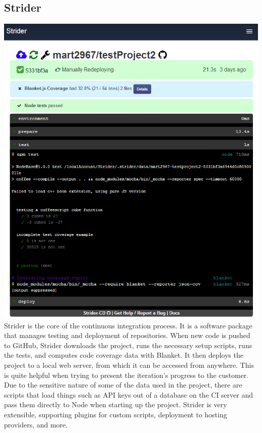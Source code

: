 \documentclass[12pt]{article}
\begin{document}
\subsection{Strider}\label{sec:strider}
\includegraphics[width=\linewidth]{img/strider_2.png}
Strider is the core of the continuous integration process. It is a software package that manages testing and deployment of repositories. When new code is pushed to GitHub, Strider downloads the project, runs the necessary setup scripts, runs the tests, and computes code coverage data with Blanket. It then deploys the project to a local web server, from which it can be accessed from anywhere. This is quite helpful when trying to present the iteration's progress to the customer. Due to the sensitive nature of some of the data used in the project, there are scripts that load things such as API keys out of a database on the CI server and pass them directly to Node when starting up the project. Strider is very extensible, supporting plugins for custom scripts, deployment to hosting providers, and more.
\end{document}
